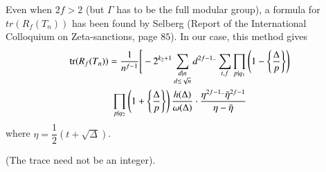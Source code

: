 \begin{note} 
  Even when $2f>2$ (but $\Gamma$ has to be the full
  modular group), a formula for $tr(R_f(T_n))$ has been found by Selberg
  (Report of the International Colloquium on Zeta-sanctions, page
  $85$). In our case, this method gives
  \begin{multline*}
    \operatorname{tr}(R_f(T_n))=\frac{1}{n^{f-1}} \Bigg[ -2^{k_2+1} \sum_{\substack {d|n
          \\{d\leq \sqrt{n}}}} d^{2f-1_-}\sum_{t,f} \prod _{p|q_1}\left(1-\left\{
      \frac{\Delta}{p}\right\} \right)\\
      \prod _{p|q_2}\left(1+\left\{ \frac{\Delta}{p}\right\}\right)
      \frac{h(\Delta)}{\omega(\Delta)}\cdot
      \frac{\eta^{2f-1_-}\bar{\eta}^{2f-1}}{\eta-  \bar{\eta}} 
  \end{multline*}
  where $\eta =\dfrac{1}{2}(t+\sqrt{\Delta})$.
\end{note}
  \begin{center}
    (The trace need not be an integer).
  \end{center}
